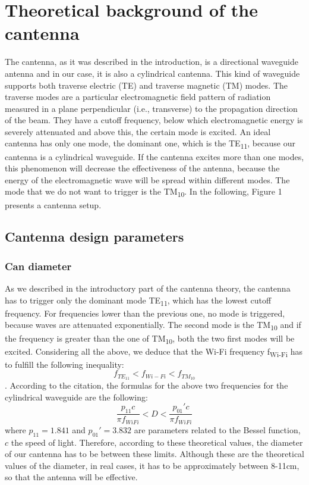 \documentclass[12pt,a4paper]{article}
\begin{document}
\section{Theoretical background of the cantenna}
The cantenna, as it was described in the introduction, is a directional waveguide antenna and in our case, it is also a cylindrical cantenna. This kind of waveguide supports both traverse electric (TE) and traverse magnetic (TM) modes. The traverse modes are a particular electromagnetic field pattern of radiation measured in a plane perpendicular (i.e., transverse) to the propagation direction of the beam. They have a cutoff frequency, below which electromagnetic energy is severely attenuated and above this, the certain mode is excited. An ideal cantenna has only one mode, the dominant one, which is the TE\textsubscript{11}, because our cantenna is a cylindrical waveguide. If the cantenna excites more than one modes, this phenomenon will decrease the effectiveness of the antenna, because the energy of the electromagnetic wave will be spread within different modes. The mode that we do not want to trigger is the TM\textsubscript{10}. In the following, Figure 1 presents a cantenna setup.



\subsection{Cantenna design parameters}
\subsubsection{Can diameter}
As we described in the introductory part of the cantenna theory, the cantenna has to trigger only the dominant mode TE\textsubscript{11}, which has the lowest cutoff frequency. For frequencies lower than the previous one, no mode is triggered, because waves are attenuated exponentially. The second mode is the TM\textsubscript{10} and if the frequency is greater than the one of TM\textsubscript{10}, both the two first modes will be excited. Considering all the above, we deduce that the Wi-Fi frequency f\textsubscript{Wi-Fi} has to fulfill the following inequality:
\begin{equation}
	f_{TE_{11}} < f_{Wi-Fi} < f_{TM_{10}}
\end{equation}
.
According to the citation\cite{waveguide}, the formulas for the above two frequencies for the cylindrical waveguide are the following:
\begin{equation}
	\frac{p_{11} c}{\pi f_{WiFi}} < D < \frac{p_{01}' c}{\pi f_{WiFi}}
\end{equation}
where $p_{11} = 1.841$ and $p_{01}'= 3.832$ are parameters related to the Bessel function, $c$ the speed of light.
Therefore, according to these theoretical values, the diameter of our cantenna has to be between these limits. Although these are the theoretical values of the diameter, in real cases, it has to be approximately between 8-11cm, so that the antenna will be effective.
\end{document}
